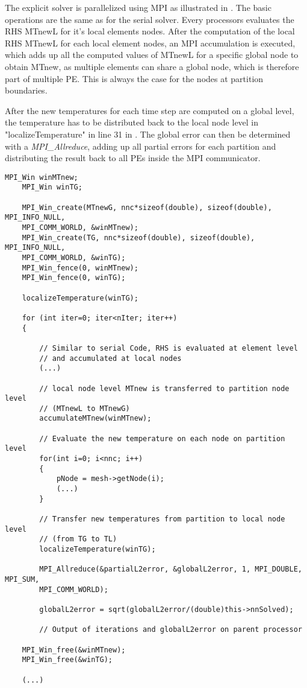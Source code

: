 The explicit solver is parallelized using MPI as illustrated in . The basic operations are the same as for the serial solver. Every processors evaluates the RHS MTnewL for it's local elements nodes. After the computation of the local RHS MTnewL for each local element nodes, an MPI accumulation is executed, which adds up all the computed values of MTnewL for a specific global node to obtain MTnew, as multiple elements can share a global node, which is therefore part of multiple PE. This is always the case for the nodes at partition boundaries.

After the new temperatures for each time step are computed on a global level, the temperature has to be distributed back to the local node level in "localizeTemperature" in line 31 in . The global error can then be determined with a \textit{MPI\_Allreduce}, adding up all partial errors for each partition and distributing the result back to all PEs inside the MPI communicator. 

\begin{lstlisting}[caption={\label{Code:MPI3} Explicit solver for MPI parallelization}]
	MPI_Win winMTnew;
	MPI_Win winTG;
	
	MPI_Win_create(MTnewG, nnc*sizeof(double), sizeof(double), MPI_INFO_NULL, 
	MPI_COMM_WORLD, &winMTnew);
	MPI_Win_create(TG, nnc*sizeof(double), sizeof(double), MPI_INFO_NULL, 
	MPI_COMM_WORLD, &winTG);
	MPI_Win_fence(0, winMTnew);
	MPI_Win_fence(0, winTG);
	
	localizeTemperature(winTG);
	
	for (int iter=0; iter<nIter; iter++)
	{
		
		// Similar to serial Code, RHS is evaluated at element level
		// and accumulated at local nodes
		(...)
		 
		// local node level MTnew is transferred to partition node level 
		// (MTnewL to MTnewG)
		accumulateMTnew(winMTnew);
		
		// Evaluate the new temperature on each node on partition level
		for(int i=0; i<nnc; i++)
		{
			pNode = mesh->getNode(i);
			(...)
		}
		
		// Transfer new temperatures from partition to local node level 
		// (from TG to TL)
		localizeTemperature(winTG);
		
		MPI_Allreduce(&partialL2error, &globalL2error, 1, MPI_DOUBLE, MPI_SUM, 
		MPI_COMM_WORLD);
		
		globalL2error = sqrt(globalL2error/(double)this->nnSolved);
		
		// Output of iterations and globalL2error on parent processor
	
	MPI_Win_free(&winMTnew);
	MPI_Win_free(&winTG);
	
	(...)
\end{lstlisting}

